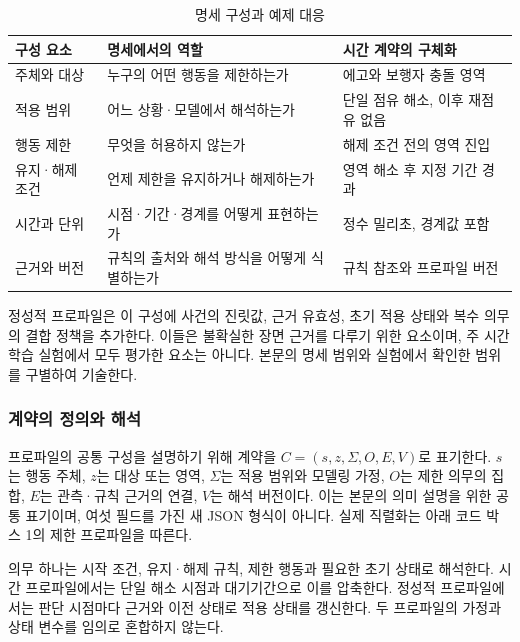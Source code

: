 \documentclass[10pt,a4paper,twocolumn]{article}\usepackage[margin=18mm]{geometry}\usepackage{fontspec,kotex}
\begin{document}
\begin{table}[tp]\caption{명세 구성과 예제 대응}
\centering\fontsize{8}{10}\selectfont\setlength{\tabcolsep}{3pt}
\begin{tabular}{@{}>{\raggedright\arraybackslash}p{}>{\raggedright\arraybackslash}p{}>{\raggedright\arraybackslash}p{}@{}}
\toprule
\textbf{구성 요소} & \textbf{명세에서의 역할} & \textbf{시간 계약의 구체화}\\
\midrule
주체와 대상 & 누구의 어떤 행동을 제한하는가 & 에고와 보행자 충돌 영역\\[3pt]
적용 범위 & 어느 상황·모델에서 해석하는가 & 단일 점유 해소, 이후 재점유 없음\\[3pt]
행동 제한 & 무엇을 허용하지 않는가 & 해제 조건 전의 영역 진입\\[3pt]
유지·해제 조건 & 언제 제한을 유지하거나 해제하는가 & 영역 해소 후 지정 기간 경과\\[3pt]
시간과 단위 & 시점·기간·경계를 어떻게 표현하는가 & 정수 밀리초, 경계값 포함\\[3pt]
근거와 버전 & 규칙의 출처와 해석 방식을 어떻게 식별하는가 & 규칙 참조와 프로파일 버전\\[3pt]
\bottomrule\end{tabular}
\end{table}

정성적 프로파일은 이 구성에 사건의 진릿값, 근거 유효성, 초기 적용 상태와 복수 의무의 결합 정책을 추가한다. 이들은 불확실한 장면 근거를 다루기 위한 요소이며, 주 시간 학습 실험에서 모두 평가한 요소는 아니다. 본문의 명세 범위와 실험에서 확인한 범위를 구별하여 기술한다.\par

\subsubsection{계약의 정의와 해석}

프로파일의 공통 구성을 설명하기 위해 계약을 $C = (s, z, \Sigma, O, E, V)$로 표기한다. $s$는 행동 주체, $z$는 대상 또는 영역, $\Sigma$는 적용 범위와 모델링 가정, $O$는 제한 의무의 집합, $E$는 관측·규칙 근거의 연결, $V$는 해석 버전이다. 이는 본문의 의미 설명을 위한 공통 표기이며, 여섯 필드를 가진 새 JSON 형식이 아니다. 실제 직렬화는 아래 코드 박스 1의 제한 프로파일을 따른다.\par

의무 하나는 시작 조건, 유지·해제 규칙, 제한 행동과 필요한 초기 상태로 해석한다. 시간 프로파일에서는 단일 해소 시점과 대기기간으로 이를 압축한다. 정성적 프로파일에서는 판단 시점마다 근거와 이전 상태로 적용 상태를 갱신한다. 두 프로파일의 가정과 상태 변수를 임의로 혼합하지 않는다.\par
\end{document}
